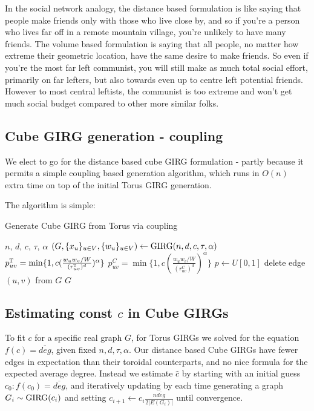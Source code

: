 In the social network analogy, the distance based formulation is like saying that people make friends only with those who live close by, and so if you're a person who lives far off in a remote mountain village, you're unlikely to have many friends. The volume based formulation is saying that all people, no matter how extreme their geometric location, have the same desire to make friends. So even if you're the most far left communist, you will still make as much total social effort, primarily on far lefters, but also towards even up to centre left potential friends. However to most central leftists, the communist is too extreme and won't get much social budget compared to other more similar folks.

\subsection{Cube GIRG generation - coupling}
We elect to go for the distance based cube GIRG formulation - partly because it permits a simple coupling based generation algorithm, which runs in $O(n)$ extra time on top of the initial Torus GIRG generation.

The algorithm is simple:

\begin{algorithm}
    \caption{Generate Cube GIRG from Torus via coupling}\label{alg:cap}
    \begin{algorithmic}
    \Require $n$, $d$, $c$, $\tau$, $\alpha$
    \State $\left ( G, \{x_u\}_{u \in V}, \{w_u\}_{u \in V} \right ) \gets \operatorname{GIRG}(n,d,c,\tau, \alpha)$
        \State $p_{uv}^{\mathbb{T}} = \min \{1, c (\frac{w_u w_v / W}{(r_{uv}^{\mathbb{T}})^d})^\alpha \}$
        \State $p_{uv}^C = \min \{1, c (\frac{w_u w_v / W}{(r_{uv}^C)^d})^\alpha \}$
        \State $p \gets U[0,1]$
            \State delete edge $(u,v)$ from $G$
        \EndIf
    \EndFor
    \State \Return $G$
\end{algorithmic}
\end{algorithm}



\subsection{Estimating const $c$ in Cube GIRGs}
To fit $c$ for a specific real graph $G$, for Torus GIRGs we solved for the equation $f(c) = \overline{deg}$, given fixed $n, d, \tau, \alpha$. Our distance based Cube GIRGs have fewer edges in expectation than their toroidal counterparts, and no nice formula for the expected average degree. Instead we estimate $\hat{c}$ by starting with an initial guess $c_0: f(c_0) = \overline{deg}$, and iteratively updating by each time generating a graph $G_i \sim \operatorname{GIRG}(c_i)$ and setting $c_{i+1} \gets c_i \frac{n \overline{deg}}{2 |E(G_i)|}$ until convergence.


